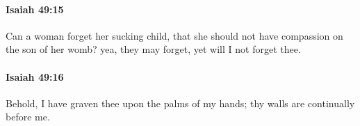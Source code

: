 		\paragraph{Isaiah 49:15} %
			\label{ISAIAH-49-15}

			Can a woman forget her sucking child, that she should not have compassion on the son of her womb? yea, they may forget, yet will I not forget thee.


		\paragraph{Isaiah 49:16} %
			\label{ISAIAH-49-16}

			Behold, I have graven thee upon the palms of my hands; thy walls are continually before me.


